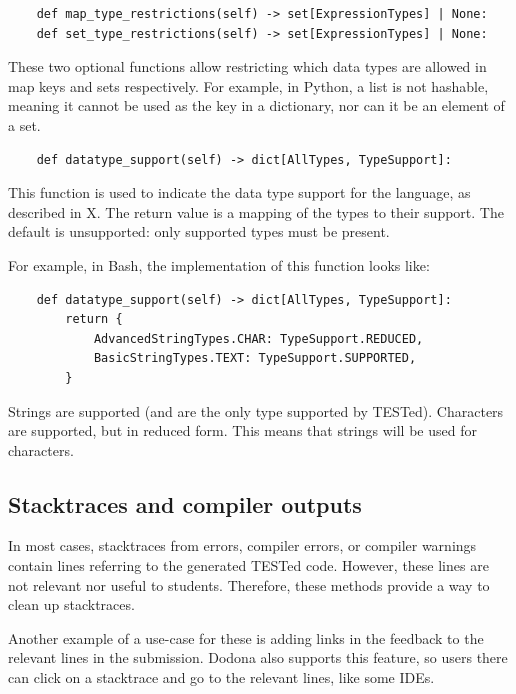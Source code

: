 \documentclass[../main]{subfiles}
\begin{document}
\begin{verbatim}
    def map_type_restrictions(self) -> set[ExpressionTypes] | None:
    def set_type_restrictions(self) -> set[ExpressionTypes] | None:
\end{verbatim}

These two optional functions allow restricting which data types are allowed in map keys and sets respectively.
For example, in Python, a list is not hashable, meaning it cannot be used as the key in a dictionary, nor can it be an element of a set.

\begin{verbatim}
    def datatype_support(self) -> dict[AllTypes, TypeSupport]:
\end{verbatim}

This function is used to indicate the data type support for the language, as described in X.
The return value is a mapping of the types to their support.
The default is unsupported: only supported types must be present.

For example, in Bash, the implementation of this function looks like:

\begin{verbatim}
    def datatype_support(self) -> dict[AllTypes, TypeSupport]:
        return {
            AdvancedStringTypes.CHAR: TypeSupport.REDUCED,
            BasicStringTypes.TEXT: TypeSupport.SUPPORTED,
        }
\end{verbatim}

Strings are supported (and are the only type supported by TESTed).
Characters are supported, but in reduced form.
This means that strings will be used for characters.

\subsection{Stacktraces and compiler outputs}\label{subsec:error-messages-and-compiler-outputs}

In most cases, stacktraces from errors, compiler errors, or compiler warnings contain lines referring to the generated TESTed code.
However, these lines are not relevant nor useful to students.
Therefore, these methods provide a way to clean up stacktraces.

Another example of a use-case for these is adding links in the feedback to the relevant lines in the submission.
Dodona also supports this feature, so users there can click on a stacktrace and go to the relevant lines, like some IDEs.
\end{document}
